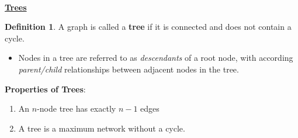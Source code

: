 \documentclass[12pt]{extarticle}
\theoremstyle{definition}
\newtheorem*{definition}{Definition}
\theoremstyle{remark}
\begin{document}
~\\
\noindent\ul{\textbf{Trees}}
\begin{definition}
    A graph is called a \textbf{tree} if it is connected and does not contain a cycle. \begin{itemize}
        \item Nodes in a tree are referred to as \textit{descendants} of a root node, with according \textit{parent/child} relationships between adjacent nodes in the tree.
    \end{itemize}
\end{definition}
\noindent \textbf{Properties of Trees}: \begin{enumerate}
    \item An $n$-node tree has exactly $n-1$ edges
    \item A tree is a maximum network without a cycle.
\end{enumerate}
\end{document}
